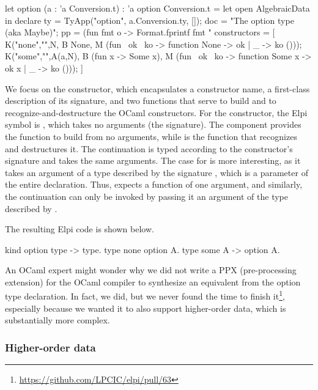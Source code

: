 \documentclass[a4paper, 11pt]{book}
\begin{document}
\begin{ocamlcode}
let option (a : 'a Conversion.t) : 'a option Conversion.t =
  let open AlgebraicData in
  declare {
    ty = TyApp("option", a.Conversion.ty, []); %
    doc = "The option type (aka Maybe)";
    pp = (fun fmt o ->
      Format.fprintf fmt "%
    constructors = [
      K("none","",N,
        B None,
        M (fun ~ok ~ko -> function None -> ok | _ -> ko ())); 
      K("some","",A(a,N),
        B (fun x -> Some x),
        M (fun ~ok ~ko -> function Some x -> ok x | _ -> ko ())); 
    ]
  }
\end{ocamlcode}

\noindent
We focus on the  constructor, which encapsulates a constructor name,
a first-class description of its signature, and two functions that serve to
build and to recognize-and-destructure the OCaml constructors. For the
 constructor, the Elpi symbol is , which takes no
arguments (the  signature). The  component provides the
function to build  from no arguments, while  is the
function that recognizes and destructures it. The  continuation is
typed according to the constructor's signature and takes the same arguments.
The case for  is more interesting, as it takes an argument of a
type described by the signature , which is a parameter of the entire
declaration. Thus,  expects a function of one argument, and
similarly, the continuation  can only be invoked by passing it an
argument of the type described by .

The resulting Elpi code is shown below.

\begin{elpicode}
kind option type -> type.
type none option A.
type some A -> option A.
\end{elpicode}

An OCaml expert might wonder why we did not write a PPX (pre-processing
extension) for the OCaml compiler to synthesize an equivalent
 from the option type declaration. In fact, we did, but we
never found the time to finish it\footnote{\url{https://github.com/LPCIC/elpi/pull/63}},
especially because we wanted it to also support higher-order data, which is
substantially more complex.


\subsubsection{Higher-order data}\label{sec:hodata}
\end{document}
